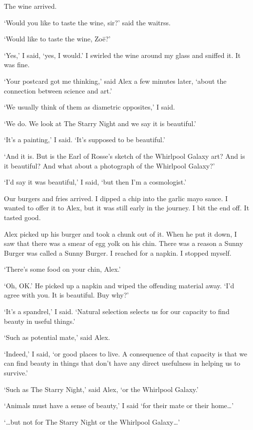The wine arrived.

`Would you like to taste the wine, sir?' said the waitrss.

`Would like to taste the wine, Zo{\"e}?'

`Yes,' I said, `yes, I would.' I swirled the wine around my glass
and sniffed it. It was fine.

`Your postcard got me thinking,' said Alex a few minutes later,
`about the connection between science and art.'

`We usually think of them as diametric opposites,' I said.

`We do. We look at {\twelvesl The Starry Night\/} and we say it is
beautiful.'

`It's a painting,' I said. `It's supposed to be beautiful.'

`And it is. But is the Earl of Rosse's sketch of the Whirlpool
Galaxy art? And is it beautiful? And what about a photograph of the
Whirlpool Galaxy?'

`I'd say it was beautiful,' I said, `but then I'm a cosmologist.'

Our burgers and fries arrived. I dipped a chip into the garlic mayo
sauce. I wanted to offer it to Alex, but it was still early in the
journey. I bit the end off. It tasted good.

Alex picked up his burger and took a chunk out of it. When he put it down, I saw that there was
a smear of egg yolk on his chin. There was a reason a Sunny Burger
was called a Sunny Burger. I reached for a napkin. I stopped myself.

`There's some food on your chin, Alex.'

`Oh, OK.' He picked up a napkin and wiped the offending material
away. `I'd agree with you. It is beautiful. Buy why?'

`It's a spandrel,' I said. `Natural selection selects us for our
capacity to find beauty in useful things.'

`Such as potential mate,' said Alex.

`Indeed,' I said, `or good places to live. A consequence of that
capacity is that we can find beauty in things that don't have any
direct usefulness in helping us to survive.'

`Such as {\twelvesl The Starry Night\/},' said Alex, `or the
Whirlpool Galaxy.'

`Animals must have a sense of beauty,' I said `for their mate or
their home\dots'

`{\dots}but not for {\twelvesl The Starry Night\/} or the Whirlpool
Galaxy\dots'

